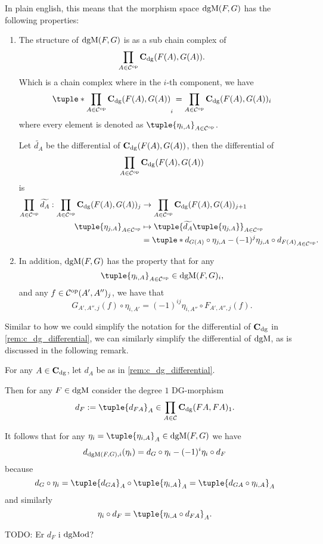 In plain english, this means that the morphism space \( \operatorname{dgM}(F, G) \) has the following properties:
\begin{enumerate}
    \item {
        The structure of \( \operatorname{dgM}(F, G) \) is as a sub chain complex of
        \[
            \prod_{A \in {\mathcal{C}}^{\operatorname{op}}} \operatorname{\mathbf{C}}_{\operatorname{dg}}(F(A), G(A)).
        \]
        Which is a chain complex where in the \( i \)-th component, we have
        \[
            \tuple*{ \prod_{A \in \Cc^{\op}} \C_{\dg}(F(A), G(A)) }_i = \prod_{A \in \Cc^{\op}} \C_{\dg}(F(A), G(A))_i
        \]
        where every element is denoted as \( \tuple{ \eta_{i, A} }_{A \in \Cc^{\op}} \).

        Let \( \widetilde{d_A} \) be the differential of \( \operatorname{\mathbf{C}}_{\operatorname{dg}}(F(A), G(A)) \), then the differential of
        \[
            \prod_{A \in {\mathcal{C}}^{\operatorname{op}}} \operatorname{\mathbf{C}}_{\operatorname{dg}}(F(A), G(A))
        \]
        is
        \begin{align*}
            \prod_{A \in \Cc^{\op}} \widetilde{d_A} : \prod_{A \in \Cc^{\op}} \C_{\dg}(F(A), G(A))_j &\to \prod_{A \in \Cc^{\op}} \C_{\dg}(F(A), G(A))_{j + 1} \\
            \tuple{ \eta_{j, A} }_{A \in \Cc^{\op}} &\mapsto \tuple{ \widetilde{d_A}\tuple{ \eta_{j, A} } }_{A \in \Cc^{\op}} \\
            &= \tuple*{ d_{G(A)} \circ \eta_{j, A} - (-1)^j \eta_{j, A} \circ d_{F(A)} }_{A \in \Cc^{\op}}.
        \end{align*}
    }
    \item {
        In addition, \( \operatorname{dgM}(F, G) \) has the property that for any
        \[
            \tuple{ \eta_{i, A} }_{A \in \Cc^{\op}} \in \dgM(F, G)_i,
        \]
        and any \( f \in {\mathcal{C}}^{\operatorname{op}}(A', A'')_j \), we have that
        \[
            G_{A', A'', j}(f) \circ \eta_{i, A'} = (-1)^{ij} \eta_{i, A''} \circ F_{A', A'', j}(f).
        \]
    }
\end{enumerate}

Similar to how we could simplify the notation for the differential of \( \operatorname{\mathbf{C}}_{\operatorname{dg}} \) in \autoref{rem:c_dg_differential}, we can similarly simplify the differential of \( \operatorname{dgM} \), as is discussed in the following remark.

\begin{remark}
    For any \( A \in \operatorname{\mathbf{C}}_{\operatorname{dg}} \), let \( d_A \) be as in \autoref{rem:c_dg_differential}.

    Then for any \( F \in \operatorname{dgM} \) consider the degree \( 1 \) DG-morphism
    \[
        d_F := \tuple{d_{FA}}_A \in \prod_{A \in \Cc} \C_{\dg}(FA, FA)_1.
    \]

    It follows that for any \( \eta_i = \tuple{\eta_{i, A}}_A \in \dgM(F, G) \) we have
    \[
        d_{\operatorname{dgM}(F, G), i}(\eta_i) = d_G \circ \eta_i - (-1)^i \eta_i \circ d_F
    \]
    because
    \[
        d_G \circ \eta_i = \tuple{d_{G A}}_A \circ \tuple{\eta_{i, A}}_A = \tuple{d_{G A} \circ \eta_{i, A}}_A
    \]
    and similarly
    \[
        \eta_i \circ d_F = \tuple{\eta_{i, A} \circ d_{F A}}_A.
    \]

    TODO: Er \( d_F \) i \( \operatorname{dgMod} \)?
\end{remark}

